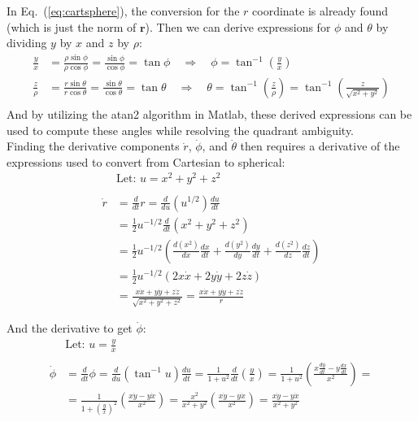 \documentclass[titlepage]{article}
\begin{document}
In Eq.~(\ref{eq:cartsphere}), the conversion for the $r$ coordinate is already found (which is just the norm of $\boldsymbol{r}$). Then we can derive expressions for $\phi$ and $\theta$ by dividing $y$ by $x$ and $z$ by $\rho$:
\begin{equation}
	\begin{split}
		\frac{y}{x}&=\frac{\rho\sin\phi}{\rho\cos\phi}=\frac{\sin\phi}{\cos\phi}=\tan\phi\quad\Rightarrow\quad\phi=\tan^{-1}\left(\frac{y}{x}\right) \\
		\frac{z}{\rho}&=\frac{r\sin\theta}{r\cos\theta}=\frac{\sin\theta}{\cos\theta}=\tan\theta\quad\Rightarrow\quad\theta=\tan^{-1}\left(\frac{z}{\rho}\right)=\tan^{-1}\left(\frac{z}{\sqrt{x^2+y^2}}\right) \\
	\end{split}
\end{equation}
And by utilizing the atan2 algorithm in Matlab, these derived expressions can be used to compute these angles while resolving the quadrant ambiguity.\\

Finding the derivative components $\dot{r}$, $\dot{\phi}$, and $\dot{\theta}$ then requires a derivative of the expressions used to convert from Cartesian to spherical:
\begin{equation}
	\begin{split}
		&\text{Let: }u=x^2+y^2+z^2 \\
		\\
		\dot{r}&=\frac{d}{dt}r=\frac{d}{du}\left(u^{1/2}\right)\frac{du}{dt} \\
		&=\frac{1}{2}u^{-1/2}\frac{d}{dt}\left(x^2+y^2+z^2\right) \\
		&=\frac{1}{2}u^{-1/2}\left(\frac{d(x^2)}{dx}\frac{dx}{dt}+\frac{d(y^2)}{dy}\frac{dy}{dt}+\frac{d(z^2)}{dz}\frac{dz}{dt}\right) \\
		&=\frac{1}{2}u^{-1/2}\left(2x\dot{x}+2y\dot{y}+2z\dot{z}\right) \\
		&=\frac{x\dot{x}+y\dot{y}+z\dot{z}}{\sqrt{x^2+y^2+z^2}}=\frac{x\dot{x}+y\dot{y}+z\dot{z}}{r}
	\end{split}
\end{equation}

And the derivative to get $\dot{\phi}$:
\begin{equation}
	\begin{split}
		&\text{Let: }u=\frac{y}{x} \\
		\\
		\dot{\phi}&=\frac{d}{dt}\phi=\frac{d}{du}\left(\tan^{-1}u\right)\frac{du}{dt}=\frac{1}{1+u^2}\frac{d}{dt}\left(\frac{y}{x}\right)=\frac{1}{1+u^2}\left(\frac{x\frac{dy}{dt}-y\frac{dx}{dt}}{x^2}\right)= \\
		&=\frac{1}{1+\left(\frac{y}{x}\right)^2}\left(\frac{x\dot{y}-y\dot{x}}{x^2}\right)=\frac{x^2}{x^2+y^2}\left(\frac{x\dot{y}-y\dot{x}}{x^2}\right)=\frac{x\dot{y}-y\dot{x}}{x^2+y^2}
	\end{split}
\end{equation}
\end{document}
